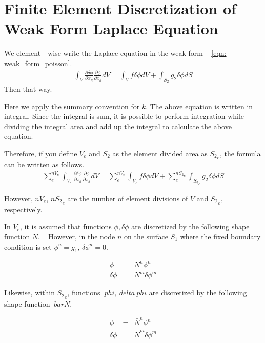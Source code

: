 \section{Finite Element Discretization of Weak Form Laplace Equation}

We element - wise write the Laplace equation in the weak form ~ \eqref{eqn: weak_form_poisson}.
%
\begin{eqnarray}
\int_V\frac{\partial\delta\phi}{\partial x_k} \frac{\partial\phi}{\partial x_k}dV  = \int_Vf\delta\phi dV + \int_{S_2} g_2 \delta \phi dS
\end{eqnarray}
%
Then that way.

Here we apply the summary convention for $k$. The above equation is written in integral.
%
Since the integral is sum, it is possible to perform integration while dividing the integral area and add up the integral to calculate the above equation.


Therefore, if you define $ V_e $ and $ S_2 $ as the element divided area as $ {S _ 2} _ e $, the formula can be written as follows.
%
\begin{eqnarray}
\sum_e^{nV_e}\int_{V_e}\frac{\partial\delta\phi}{\partial x_k} \frac{\partial\phi}{\partial x_k}dV
= \sum_e^{nV_e}\int_{V_e}f\delta\phi dV + \sum_e^{{nS_2}_e}\int_{{S_2}_e} g_2 \delta \phi dS
\end{eqnarray}
%

However, $nV_e $, $ {nS_2}_e$ are the number of element divisions of $ V $ and ${S_2}_e$, respectively.

In $ V_e $, it is assumed that functions $ \phi, \delta \phi $ are discretized by the following shape function $ N $. ~
However, in the node $ \bar{n} $ on the surface $ S_1 $ where the fixed boundary condition is set $ \phi^{\bar{n}} = g_1 $, $ \delta \phi^{\bar{n}}=0$.

\begin{eqnarray}
\phi &=& N^n\phi^n\\
\delta\phi &=& N^m\delta\phi^m
\end{eqnarray}


Likewise, within $ {S _ 2} _ e $, functions $ \ phi, \ delta \ phi $ are discretized by the following shape function $ \ bar {N} $.

\begin{eqnarray}
\phi &=& \bar{N}^n\phi^n\\
\delta\phi &=& \bar{N}^m\delta\phi^m
\end{eqnarray}


